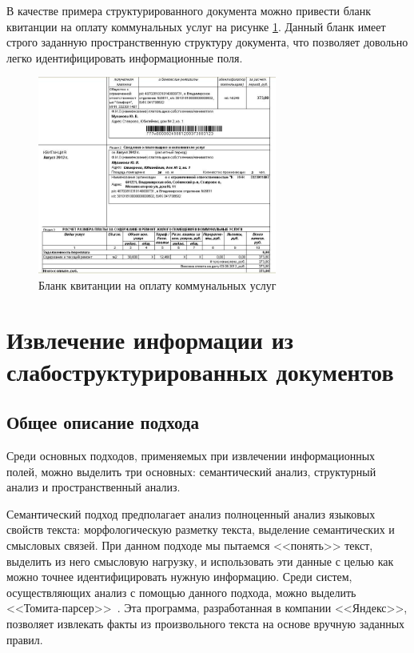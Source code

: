 В качестве примера структурированного документа можно привести бланк квитанции на оплату коммунальных услуг на рисунке \ref{fig:ege-blank}. Данный бланк имеет строго заданную пространственную структуру документа, что позволяет довольно легко идентифицировать информационные поля.

\begin{figure}%
\centering
\includegraphics[width=0.7\textwidth]{img/blank.jpg}
\caption{Бланк квитанции на оплату коммунальных услуг}
\label{fig:ege-blank}
\end{figure}

\section{Извлечение информации из слабоструктурированных документов}
\subsection{Общее описание подхода}
Среди основных подходов, применяемых при извлечении информационных полей, можно выделить три основных: семантический анализ, структурный анализ и пространственный анализ.

Семантический подход предполагает анализ полноценный анализ языковых свойств текста: морфологическую разметку текста, выделение семантических и смысловых связей. При данном подходе мы пытаемся <<понять>> текст, выделить из него смысловую нагрузку, и использовать эти данные с целью как можно точнее идентифицировать нужную информацию. Среди систем, осуществляющих анализ с помощью данного подхода, можно выделить <<Томита-парсер>>~\autocite{tomita-parser}. Эта программа, разработанная в компании <<Яндекс>>, позволяет извлекать факты из произвольного текста на основе вручную заданных правил.

